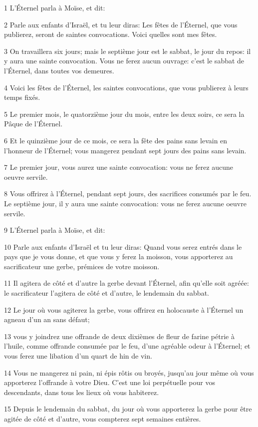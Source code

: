 \par 1 L'Éternel parla à Moïse, et dit:
\par 2 Parle aux enfants d'Israël, et tu leur diras: Les fêtes de l'Éternel, que vous publierez, seront de saintes convocations. Voici quelles sont mes fêtes.
\par 3 On travaillera six jours; mais le septième jour est le sabbat, le jour du repos: il y aura une sainte convocation. Vous ne ferez aucun ouvrage: c'est le sabbat de l'Éternel, dans toutes vos demeures.
\par 4 Voici les fêtes de l'Éternel, les saintes convocations, que vous publierez à leurs temps fixés.
\par 5 Le premier mois, le quatorzième jour du mois, entre les deux soirs, ce sera la Pâque de l'Éternel.
\par 6 Et le quinzième jour de ce mois, ce sera la fête des pains sans levain en l'honneur de l'Éternel; vous mangerez pendant sept jours des pains sans levain.
\par 7 Le premier jour, vous aurez une sainte convocation: vous ne ferez aucune oeuvre servile.
\par 8 Vous offrirez à l'Éternel, pendant sept jours, des sacrifices consumés par le feu. Le septième jour, il y aura une sainte convocation: vous ne ferez aucune oeuvre servile.
\par 9 L'Éternel parla à Moïse, et dit:
\par 10 Parle aux enfants d'Israël et tu leur diras: Quand vous serez entrés dans le pays que je vous donne, et que vous y ferez la moisson, vous apporterez au sacrificateur une gerbe, prémices de votre moisson.
\par 11 Il agitera de côté et d'autre la gerbe devant l'Éternel, afin qu'elle soit agréée: le sacrificateur l'agitera de côté et d'autre, le lendemain du sabbat.
\par 12 Le jour où vous agiterez la gerbe, vous offrirez en holocauste à l'Éternel un agneau d'un an sans défaut;
\par 13 vous y joindrez une offrande de deux dixièmes de fleur de farine pétrie à l'huile, comme offrande consumée par le feu, d'une agréable odeur à l'Éternel; et vous ferez une libation d'un quart de hin de vin.
\par 14 Vous ne mangerez ni pain, ni épis rôtis ou broyés, jusqu'au jour même où vous apporterez l'offrande à votre Dieu. C'est une loi perpétuelle pour vos descendants, dans tous les lieux où vous habiterez.
\par 15 Depuis le lendemain du sabbat, du jour où vous apporterez la gerbe pour être agitée de côté et d'autre, vous compterez sept semaines entières.
